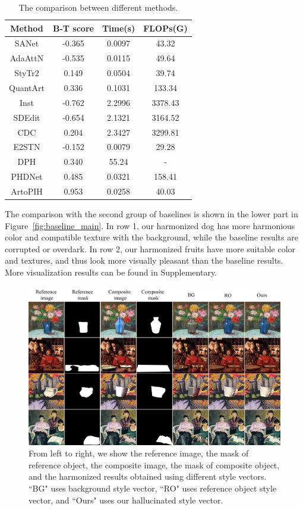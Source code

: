 \documentclass[letterpaper]{article} %
\begin{document}
\begin{table}[t]
\centering
\begin{tabular}{c|c|c|c}
\hline
Method  & B-T score & Time(s)  & FLOPs(G) \\
\hline
SANet  & -0.365 & 0.0097 & 43.32\\
AdaAttN  & -0.535 & 0.0115 & 49.64\\
StyTr2  &  0.149 & 0.0504 & 39.74\\
QuantArt   & 0.336 & 0.1031 & 133.34 \\
Inst  & -0.762 & 2.2996 & 3378.43 \\
\hline
SDEdit  & -0.654 & 2.1321 & 3164.52\\
CDC   &  0.204 & 2.3427 & 3299.81 \\
E2STN & -0.152 & 0.0079 & 29.28\\
DPH   & 0.340 & 55.24 & -\\
PHDNet  & 0.485 & 0.0321 & 158.41\\
\hline
ArtoPIH  & 0.953 & 0.0258 & 40.03\\
\hline
\end{tabular}
\caption{The comparison between different methods. }
\label{tab:results}
\end{table}

The comparison with the second group of baselines is shown in the lower part in Figure~\ref{fig:baseline_main}. In row 1, our harmonized dog has more harmonious color and compatible texture with the background, while the baseline results are corrupted or overdark. In row 2, our harmonized fruits have more suitable color and textures, and thus look more visually pleasant than the baseline results. More visualization results can be found in Supplementary.



\begin{figure}[t]
\centering
\includegraphics[width=0.95\linewidth]{figures/reference_results.jpg}
\caption{From left to right, we show the reference image, the mask of reference object, the composite image, the mask of composite object, and the harmonized results obtained using different style vectors. ``BG" uses background style vector, ``RO" uses reference object style vector, and ``Ours" uses our hallucinated style vector.}
\label{fig:reference_results}
\end{figure}
\end{document}
